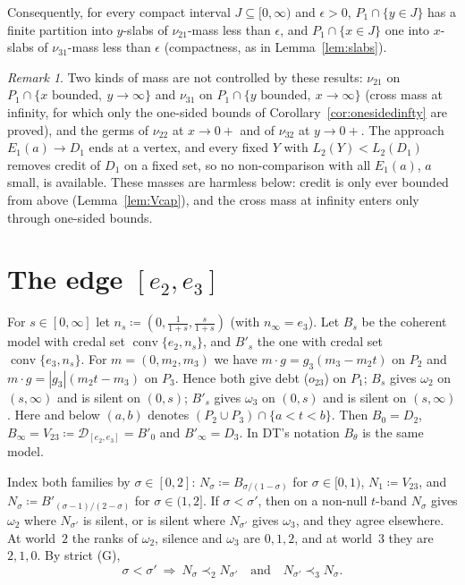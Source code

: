 \documentclass[11pt]{article}
\theoremstyle{definition}\newtheorem{definition}[theorem]{Definition}
\theoremstyle{remark}\newtheorem{remark}[theorem]{Remark}
\newcommand{\Dscr}{\mathcal D}
\begin{document}
Consequently, for every compact interval $J\subseteq[0,\infty)$ and
$\epsilon>0$, $P_1\cap\{y\in J\}$ has a finite partition into $y$-slabs of
$\nu_{21}$-mass less than $\epsilon$, and $P_1\cap\{x\in J\}$ one into
$x$-slabs of $\nu_{31}$-mass less than $\epsilon$ (compactness, as in
Lemma~\ref{lem:slabs}).

\begin{remark}\label{rem:notcontrolled}
Two kinds of mass are not controlled by these results: $\nu_{21}$ on
$P_1\cap\{x\text{ bounded},\ y\to\infty\}$ and $\nu_{31}$ on
$P_1\cap\{y\text{ bounded},\ x\to\infty\}$ (cross mass at infinity, for which
only the one-sided bounds of Corollary~\ref{cor:onesidedinfty} are proved),
and the germs of $\nu_{22}$ at $x\to0+$ and of $\nu_{32}$ at $y\to0+$. The
approach $E_1(a)\to D_1$ ends at a vertex, and every fixed $Y$ with
$L_2(Y)<L_2(D_1)$ removes credit of $D_1$ on a fixed set, so no
non-comparison with all $E_1(a)$, $a$ small, is available. These masses are
harmless below: credit is only ever bounded from above
(Lemma~\ref{lem:Vcap}), and the cross mass at infinity enters only through
one-sided bounds.
\end{remark}

\section{The edge \texorpdfstring{$[e_2,e_3]$}{[e2,e3]}}\label{sec:edge23}

For $s\in[0,\infty]$ let $n_s\coloneqq(0,\frac1{1+s},\frac s{1+s})$ (with
$n_\infty=e_3$). Let $B_s$ be the coherent model with credal set
$\operatorname{conv}\{e_2,n_s\}$, and $B'_s$ the one with credal set
$\operatorname{conv}\{e_3,n_s\}$. For $m=(0,m_2,m_3)$ we have $m\cdot
g=g_3(m_3-m_2t)$ on $P_2$ and $m\cdot g=|g_3|(m_2t-m_3)$ on $P_3$. Hence both
give debt ($o_{23}$) on $P_1$; $B_s$ gives $\omega_2$ on $(s,\infty)$ and is
silent on $(0,s)$; $B'_s$ gives $\omega_3$ on $(0,s)$ and is silent on
$(s,\infty)$. Here and below $(a,b)$ denotes $(P_2\cup P_3)\cap\{a<t<b\}$.
Then $B_0=D_2$, $B_\infty=V_{23}\coloneqq\Dscr_{[e_2,e_3]}=B'_0$ and
$B'_\infty=D_3$. In DT's notation $B_\theta$ is the same model.

Index both families by $\sigma\in[0,2]$: $N_\sigma\coloneqq B_{\sigma/(1-
\sigma)}$ for $\sigma\in[0,1)$, $N_1\coloneqq V_{23}$, and
$N_\sigma\coloneqq B'_{(\sigma-1)/(2-\sigma)}$ for $\sigma\in(1,2]$. If
$\sigma<\sigma'$, then on a non-null $t$-band $N_\sigma$ gives $\omega_2$
where $N_{\sigma'}$ is silent, or is silent where $N_{\sigma'}$ gives
$\omega_3$, and they agree elsewhere. At world~$2$ the ranks of $\omega_2$,
silence and $\omega_3$ are $0,1,2$, and at world~$3$ they are $2,1,0$. By
strict (G),
\begin{equation}
 \sigma<\sigma'\ \Longrightarrow\ N_\sigma\prec_2N_{\sigma'}\quad\text{and}
 \quad N_{\sigma'}\prec_3N_\sigma .
 \label{eq:order23}
\end{equation}
\end{document}
